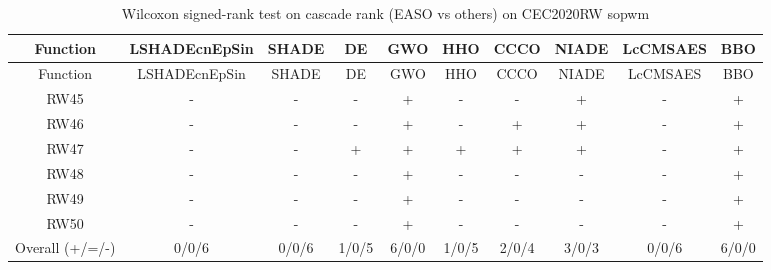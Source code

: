\begin{center}
\small
\renewcommand{\arraystretch}{1.25}
\begin{longtable}{cccccccccc}
\caption{Wilcoxon signed-rank test on cascade rank (EASO vs others) on CEC2020RW  sopwm}
\label{tab:wilcoxon_cascade_CEC2020RW_sopwm} \\
\toprule
Function & LSHADEcnEpSin & SHADE & DE & GWO & HHO & CCCO & NIADE & LcCMSAES & BBO \\
\midrule
\endfirsthead
\toprule
Function & LSHADEcnEpSin & SHADE & DE & GWO & HHO & CCCO & NIADE & LcCMSAES & BBO \\
\midrule
\endhead
RW45 & - & - & - & + & - & - & + & - & + \\
RW46 & - & - & - & + & - & + & + & - & + \\
RW47 & - & - & + & + & + & + & + & - & + \\
RW48 & - & - & - & + & - & - & - & - & + \\
RW49 & - & - & - & + & - & - & - & - & + \\
RW50 & - & - & - & + & - & - & - & - & + \\
\midrule
Overall (+/=/-) & 0/0/6 & 0/0/6 & 1/0/5 & 6/0/0 & 1/0/5 & 2/0/4 & 3/0/3 & 0/0/6 & 6/0/0 \\
\bottomrule
\end{longtable}
\end{center}